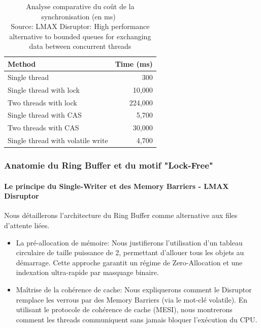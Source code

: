 \begin{table}[h!]
    \centering
    \label{tab:comparaison_sync} %
    \begin{tabular}{|l|r|} %
        \hline
        \textbf{Method} & \textbf{Time (ms)} \\ \hline
        Single thread & 300 \\ \hline
        Single thread with lock & 10,000 \\ \hline
        Two threads with lock & 224,000 \\ \hline
        Single thread with CAS & 5,700 \\ \hline
        Two threads with CAS & 30,000 \\ \hline
        Single thread with volatile write & 4,700 \\ \hline
    \end{tabular}
    \caption{Analyse comparative du coût de la synchronisation (en ms) \\ Source: LMAX Disruptor: High performance alternative to bounded queues for exchanging data between concurrent threads}
\end{table}

\subsubsection{Anatomie du Ring Buffer et du motif "Lock-Free"}

\paragraph{Le principe du Single-Writer et des Memory Barriers - LMAX Disruptor}

Nous détaillerons l'architecture du Ring Buffer comme alternative aux files d'attente liées.

\begin{itemize}
    \item La pré-allocation de mémoire: Nous justifierons l'utilisation d'un tableau circulaire de taille puissance de 2, permettant d'allouer tous les objets au démarrage. Cette approche garantit un régime de Zero-Allocation et une indexation ultra-rapide par masquage binaire.
    \item Maîtrise de la cohérence de cache: Nous expliquerons comment le Disruptor remplace les verrous par des Memory Barriers (via le mot-clé volatile). En utilisant le protocole de cohérence de cache (MESI), nous montrerons comment les threads communiquent sans jamais bloquer l'exécution du CPU.
\end{itemize}

